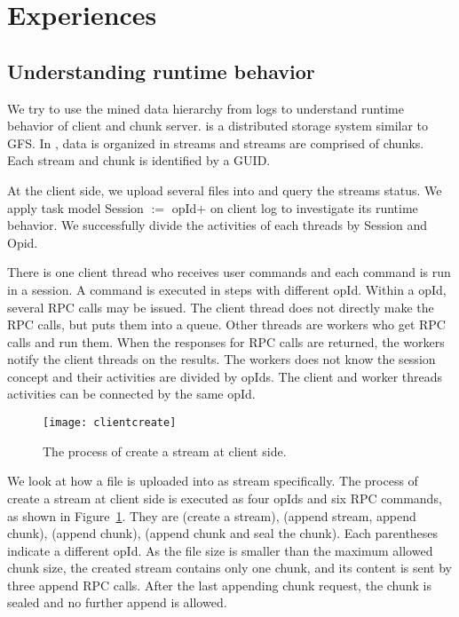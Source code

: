 
\section{Experiences}
\label{sec:exp}


\subsection{Understanding runtime behavior}

We try to use the mined data hierarchy from logs to
understand runtime behavior of \cosmos client and chunk
server.  \cosmos is a distributed storage system similar to
GFS. In \cosmos, data is organized in streams and streams
are comprised of chunks. Each stream and chunk is identified
by a GUID.

At the client side, we upload several files into \cosmos and
query the streams status. We apply task model Session $:=$
opId$+$ on \cosmos client log to investigate its runtime
behavior. We successfully divide the activities of each
threads by Session and Opid.

There is one client thread who receives user commands and
each command is run in a session. A command is executed in
steps with different opId. Within a opId,  several RPC calls
may be issued. The client thread does not directly make the
RPC calls, but puts them into a queue. Other threads are
workers who get RPC calls and run them. When the responses
for RPC calls are returned, the workers notify the client
threads on the results. The workers does not know the
session concept and their activities are divided by opIds.
The client and worker threads activities can be connected by
the same opId.

\begin{figure}
\centering
\texttt{[image: clientcreate]}
\caption{The process of create a stream at client side.}
\label{fig:clientcreate}
\end{figure}

We look at how a file is uploaded into \cosmos as stream
specifically. The process of create a stream at client side
is executed as four opIds and six RPC commands, as shown in
Figure~\ref{fig:clientcreate}. They are (create a stream),
(append stream, append chunk), (append chunk), (append
chunk and seal the chunk). Each parentheses indicate a
different opId. As the file size is smaller than the maximum
allowed chunk size, the created stream contains only one
chunk, and its content is sent by three append RPC calls.
After the last appending chunk request, the chunk is
sealed and no further append is allowed.

